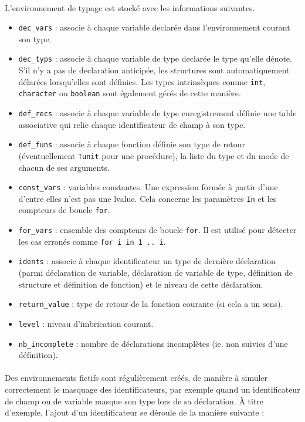 \documentclass[a4paper,12pt]{article}
\begin{document}
\paragraph*{}
L'environnement de typage est stocké avec les informations suivantes.
\begin{itemize}
\item \texttt{dec\_vars} : associe à chaque variable declarée dans l'environnement courant son type.
\item \texttt{dec\_typs} : associe à chaque variable de type declarée le type qu'elle dénote. S'il n'y a pas de declaration anticipée, les structures sont automatiquement délarées lorsqu'elles sont définies. Les types intrinsèques comme \texttt{int}, \texttt{character} ou \texttt{boolean} sont également gérés de cette manière.
\item \texttt{def\_recs} : associe à chaque variable de type enregistrement définie une table associative qui relie chaque identificateur de champ à son type.
\item \texttt{def\_funs} : associe à chaque fonction définie son type de retour (éventuellement \texttt{Tunit} pour une procédure), la liste du type et du mode de chacun de ses arguments.
\item \texttt{const\_vars} : variables constantes. Une expression formée à partir d'une d'entre elles n'est pas une lvalue. Cela concerne les paramètres \texttt{In} et les compteurs de boucle \texttt{for}.
\item \texttt{for\_vars} : ensemble des compteurs de boucle \texttt{for}. Il est utilisé pour détecter les cas erronés comme \texttt{for i in 1 .. i}. 
\item \texttt{idents} : associe à chaque identificateur un type de dernière déclaration (parmi déclaration de variable, déclaration de variable de type, définition de structure et définition de fonction) et le niveau de cette déclaration.
\item \texttt{return\_value} : type de retour de la fonction courante (si cela a un sens).
\item \texttt{level} : niveau d'imbrication courant. 
\item \texttt{nb\_incomplete} : nombre de déclarations incomplètes (ie. non suivies d'une définition).
\end{itemize}

\paragraph*{}
Des environnements fictifs sont régulièrement créés, de manière à simuler correctement le masquage des identificateurs, par exemple quand un identificateur de champ ou de variable masque son type lors de sa déclaration. À titre d'exemple, l'ajout d'un identificateur se déroule de la manière suivante :
\end{document}
